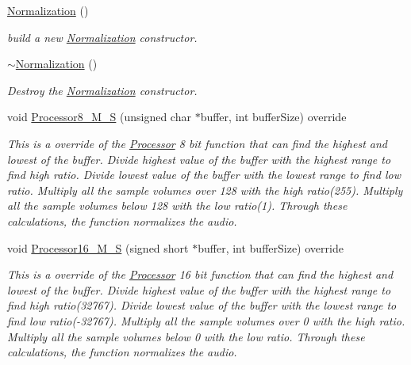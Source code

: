 \begin{DoxyCompactItemize}
\item 
\mbox{\label{classNormalization_a7998284e5456d915ebdb2520e4d74250}} 
\hyperlink{classNormalization_a7998284e5456d915ebdb2520e4d74250}{Normalization} ()
\begin{DoxyCompactList}\small\item\em build a new \hyperlink{classNormalization}{Normalization} constructor. \end{DoxyCompactList}\item 
\mbox{\label{classNormalization_af1435f572ca4cd9a93b59c750588a235}} 
\hyperlink{classNormalization_af1435f572ca4cd9a93b59c750588a235}{$\sim$\+Normalization} ()
\begin{DoxyCompactList}\small\item\em Destroy the \hyperlink{classNormalization}{Normalization} constructor. \end{DoxyCompactList}\item 
void \hyperlink{classNormalization_ab1303e7cd41e3ec49edafd7b83cb5480}{Processor8\+\_\+\+M\+\_\+S} (unsigned char $\ast$buffer, int buffer\+Size) override
\begin{DoxyCompactList}\small\item\em This is a override of the \hyperlink{classProcessor}{Processor} 8 bit function that can find the highest and lowest of the buffer. Divide highest value of the buffer with the highest range to find high ratio. Divide lowest value of the buffer with the lowest range to find low ratio. Multiply all the sample volumes over 128 with the high ratio(255). Multiply all the sample volumes below 128 with the low ratio(1). Through these calculations, the function normalizes the audio. \end{DoxyCompactList}\item 
void \hyperlink{classNormalization_a9e20f1881043dbce47e11ebdca6689ca}{Processor16\+\_\+\+M\+\_\+S} (signed short $\ast$buffer, int buffer\+Size) override
\begin{DoxyCompactList}\small\item\em This is a override of the \hyperlink{classProcessor}{Processor} 16 bit function that can find the highest and lowest of the buffer. Divide highest value of the buffer with the highest range to find high ratio(32767). Divide lowest value of the buffer with the lowest range to find low ratio(-\/32767). Multiply all the sample volumes over 0 with the high ratio. Multiply all the sample volumes below 0 with the low ratio. Through these calculations, the function normalizes the audio. \end{DoxyCompactList}\end{DoxyCompactItemize}


